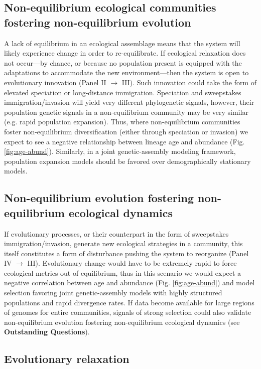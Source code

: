 \documentclass[12pt]{article}
\begin{document}
\subsection{Non-equilibrium ecological communities fostering non-equilibrium evolution}

A lack of equilibrium in an ecological assemblage means that the
system will likely experience change in order to re-equilibrate. If
ecological relaxation does not occur---by chance, or because no
population present is equipped with the adaptations to accommodate the
new environment---then the system is open to evolutionary innovation
(Panel II $\rightarrow$ III).  Such innovation could take the form of
elevated speciation or long-distance immigration. Speciation and
sweepstakes immigration/invasion will yield very different
phylogenetic signals, however, their population genetic signals in a
non-equilibrium community may be very similar (e.g. rapid population
expansion). Thus, where non-equilibrium communities foster
non-equilibrium diversification (either through speciation or
invasion) we expect to see a negative relationship between lineage age
and abundance (Fig.  \ref{fig:age-abund}). Similarly, in a joint
genetic-assembly modeling framework, population expansion models
should be favored over demographically stationary models.

\subsection{Non-equilibrium evolution fostering non-equilibrium ecological dynamics}

If evolutionary processes, or their counterpart in the form of
sweepstakes immigration/invasion, generate new ecological strategies
in a community, this itself constitutes a form of disturbance pushing
the system to reorganize (Panel IV $\rightarrow$ III).  Evolutionary
change would have to be extremely rapid to force ecological metrics
out of equilibrium, thus in this scenario we would expect a negative
correlation between age and abundance (Fig. \ref{fig:age-abund}) and
model selection favoring joint genetic-assembly models with highly
structured populations and rapid divergence rates. If data become
available for large regions of genomes for entire communities, signals
of strong selection could also validate non-equilibrium evolution
fostering non-equilibrium ecological dynamics (see {\bf Outstanding
  Questions}).

\subsection{Evolutionary relaxation}
\end{document}
